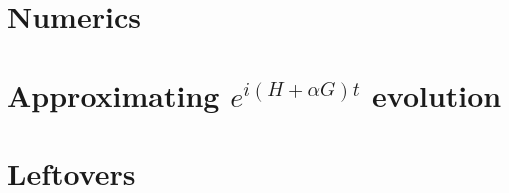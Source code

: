\documentclass{article}
\begin{document}
\section{Numerics}



\section{Approximating $e^{i (H + \alpha G) t}$ evolution}


\section{Leftovers}
\end{document}
